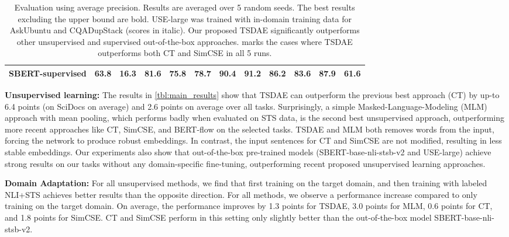 \documentclass[11pt]{article}
\begin{document}
\begin{table*}[t]
{\begin{tabular}{|l|c|c|ccc|ccccc|c|}
\hline
SBERT-supervised  & 63.8                               & 16.3                   & 81.6                   & 75.8                   & 78.7                      & 90.4           & 91.2           & 86.2                           & 83.6           & 87.9                      & 61.6                   \\
\hline
\end{tabular}}
\caption{Evaluation using average precision. Results are averaged over 5 random seeds. The best results excluding the upper bound are bold. USE-large was trained with in-domain training data for AskUbuntu and CQADupStack (scores in italic). Our proposed TSDAE significantly outperforms other unsupervised and supervised out-of-the-box approaches. marks the cases where TSDAE outperforms both CT and SimCSE in all 5 runs.}
\label{tbl:main_results}
\end{table*}



\textbf{Unsupervised learning:} The results in \autoref{tbl:main_results} show that TSDAE can outperform the previous best approach (CT) by up-to 6.4 points (on SciDocs on average) and 2.6 points on average over all tasks. Surprisingly, a simple Masked-Language-Modeling (MLM) approach with mean pooling, which performs badly when evaluated on STS data, is the second best unsupervised approach, outperforming more recent approaches like CT, SimCSE, and BERT-flow on the selected tasks. TSDAE and MLM both removes words from the input, forcing the network to produce robust embeddings. In contrast, the input sentences for CT and SimCSE are not modified, resulting in less stable embeddings. Our experiments also show that out-of-the-box pre-trained models (SBERT-base-nli-stsb-v2 and USE-large) achieve strong results on our tasks without any domain-specific fine-tuning, outperforming recent proposed unsupervised learning approaches. 


\textbf{Domain Adaptation:} For all unsupervised methods, we find that first training on the target domain, and then training with labeled NLI+STS achieves better results than the opposite direction.  For all methods, we observe a performance increase compared to only training on the target domain. On average, the performance improves by 1.3 points for TSDAE, 3.0 points for MLM, 0.6 points for CT, and 1.8 points for SimCSE. CT and SimCSE perform in this setting only slightly better than the out-of-the-box model SBERT-base-nli-stsb-v2.
\end{document}
